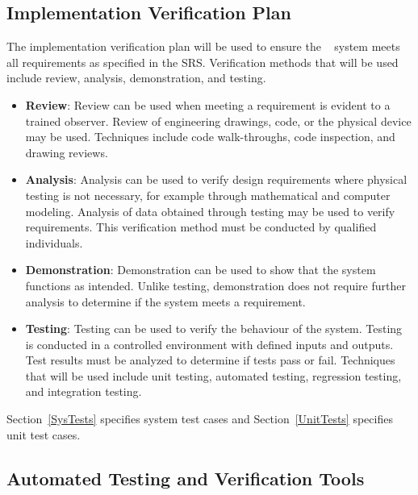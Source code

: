 \documentclass[12pt, titlepage]{article}
\begin{document}
\subsection{Implementation Verification Plan}


  
  The implementation verification plan will be used to ensure the \progname~ system meets all requirements as specified in the SRS. Verification methods that will be used include review, analysis, demonstration, and testing. 
\begin{itemize}
  \item \textbf{Review}: Review can be used when meeting a requirement is evident to a trained observer. Review of engineering drawings, code, or the physical device may be used. Techniques include code walk-throughs, code inspection, and drawing reviews.
  \item \textbf{Analysis}: Analysis can be used to verify design requirements where physical testing is not necessary, for example through mathematical and computer modeling. Analysis of data obtained through testing may be used to verify requirements. This verification method must be conducted by qualified individuals.
  \item \textbf{Demonstration}: Demonstration can be used to show that the system functions as intended. Unlike testing, demonstration does not require further analysis to determine if the system meets a requirement.
  \item \textbf{Testing}: Testing can be used to verify the behaviour of the system. Testing is conducted in a controlled environment with defined inputs and outputs. Test results must be analyzed to determine if tests pass or fail. Techniques that will be used include unit testing, automated testing, regression testing, and integration testing.
\end{itemize}

\noindent Section~\ref{SysTests} specifies system test cases and Section~\ref{UnitTests} specifies unit test cases.

\subsection{Automated Testing and Verification Tools}
\end{document}
